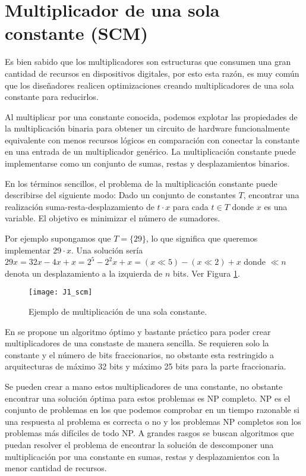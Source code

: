     \section{Multiplicador de una sola constante (SCM)}

        Es bien sabido que los multiplicadores son estructuras que consumen una gran cantidad de recursos en dispositivos digitales, por esto esta razón, es muy común que los diseñadores realicen optimizaciones creando multiplicadores de una sola constante para reducirlos.

        Al multiplicar por una constante conocida, podemos explotar las propiedades de la multiplicación binaria para obtener un circuito de hardware funcionalmente equivalente con menos recursos lógicos en comparación con conectar la constante en una entrada de un multiplicador genérico. La multiplicación constante puede implementarse como un conjunto de sumas, restas y desplazamientos binarios.

            En los términos sencillos, el problema de la multiplicación constante puede describirse del siguiente modo: Dado un conjunto de constantes $T$, encontrar una realización suma-resta-desplazamiento de $t \cdot x$ para cada $t \in T$ donde $x$ es una variable. El objetivo es minimizar el número de sumadores.
            
            Por ejemplo supongamos que $T = \{29 \}$, lo que significa que queremos implementar $29 \cdot x$. Una solución sería $29x = 32x - 4x +x = 2^{5} - 2^{2}x + x = (x \ll 5) - (x \ll 2) + x$ donde $ \ll n $ denota un desplazamiento a la izquierda de $n$ bits. Ver Figura \ref{fig:J1_scm}.

        \begin{figure}[hbtp]
            \caption{Ejemplo de multiplicación de una sola constante.}
            \centering
            \texttt{[image: J1\_scm]}
            \label{fig:J1_scm}
        \end{figure}
        
        En \cite{Thong2011} se propone un algoritmo óptimo y bastante práctico para poder crear multiplicadores de una constaste de manera sencilla. Se requieren solo la constante y el número de bits fraccionarios, no obstante esta restringido a arquitecturas de máximo 32 bits y máximo 25 bits para la parte fraccionaria.

        Se pueden crear a mano estos multiplicadores de una constante, no obstante encontrar una solución óptima para estos problemas es NP completo. NP es el conjunto de problemas en los que podemos comprobar en un tiempo razonable si una respuesta al problema es correcta o no y los problemas NP completos son los problemas más difíciles de todo NP. A grandes rasgos se buscan algoritmos que puedan resolver el problema de encontrar la solución de descomponer una multiplicación por una constante en sumas, restas y desplazamientos con la menor cantidad de recursos.

